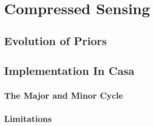 \section{Compressed Sensing}


\subsection{Evolution of Priors}

\subsection{Implementation In Casa}
\subsubsection{The Major and Minor Cycle}
\subsubsection{Limitations}

